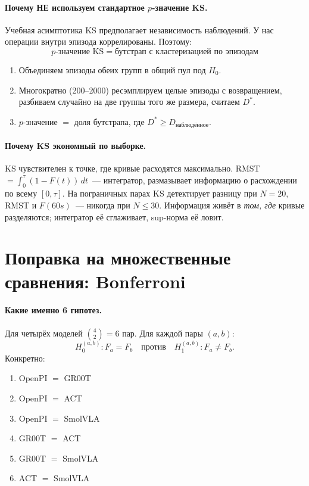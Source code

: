 \documentclass[11pt]{article}
\begin{document}
\paragraph{Почему НЕ используем стандартное $p$-значение KS.} Учебная асимптотика KS предполагает независимость наблюдений. У нас операции внутри эпизода коррелированы. Поэтому:
\[
p\text{-значение KS} = \text{бутстрап с кластеризацией по эпизодам}
\]
\begin{enumerate}[leftmargin=2em, itemsep=1pt]
\item Объединяем эпизоды обеих групп в общий пул под $H_0$.
\item Многократно (200--2000) ресэмплируем целые эпизоды с возвращением, разбиваем случайно на две группы того же размера, считаем $D^*$.
\item $p$-значение $=$ доля бутстрапа, где $D^* \ge D_{\text{наблюдённое}}$.
\end{enumerate}

\paragraph{Почему KS экономный по выборке.} KS чувствителен к точке, где кривые расходятся максимально. RMST $= \int_0^\tau (1-F(t))\,dt$~--- интегратор, размазывает информацию о расхождении по всему $[0,\tau]$. На пограничных парах KS детектирует разницу при $N=20$, RMST и $F(60s)$~--- никогда при $N \le 30$. Информация живёт в \emph{том, где} кривые разделяются; интегратор её сглаживает, sup-норма её ловит.

\section{Поправка на множественные сравнения: Bonferroni}

\paragraph{Какие именно 6 гипотез.} Для четырёх моделей $\binom{4}{2} = 6$ пар. Для каждой пары $(a, b)$:
\[
H_0^{(a,b)}: F_a = F_b \quad\text{против}\quad H_1^{(a,b)}: F_a \neq F_b.
\]
Конкретно:
\begin{enumerate}[leftmargin=2em, itemsep=0pt]
\item OpenPI $=$ GR00T
\item OpenPI $=$ ACT
\item OpenPI $=$ SmolVLA
\item GR00T $=$ ACT
\item GR00T $=$ SmolVLA
\item ACT $=$ SmolVLA
\end{enumerate}
\end{document}
